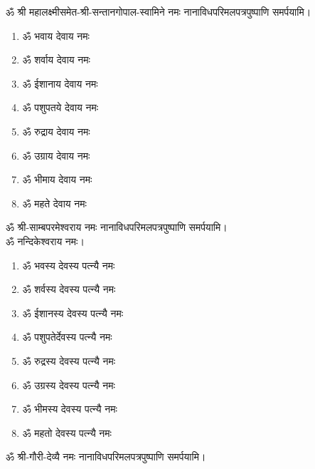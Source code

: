 \begin{center}
ॐ श्री महालक्ष्मीसमेत-श्री-सन्तानगोपाल-स्वामिने नमः नानाविधपरिमलपत्रपुष्पाणि समर्पयामि। \medskip

\clearpage
{}

\vspace{-1em}
\begin{multicols}{2}
\begin{enumerate}
\item ॐ भवाय देवाय नमः
\item ॐ शर्वाय देवाय नमः
\item ॐ ईशानाय देवाय नमः
\item ॐ पशुपतये देवाय नमः
\item ॐ रुद्राय देवाय नमः
\item ॐ उग्राय देवाय नमः
\item ॐ भीमाय देवाय नमः
\item ॐ महते देवाय नमः
\end{enumerate}
\end{multicols}
\vspace{-1em}
ॐ श्री-साम्बपरमेश्वराय नमः नानाविधपरिमलपत्रपुष्पाणि समर्पयामि। \\
ॐ नन्दिकेश्वराय नमः।

\begin{enumerate}
\item ॐ भवस्य देवस्य पत्न्यै नमः
\item ॐ शर्वस्य देवस्य पत्न्यै नमः
\item ॐ ईशानस्य देवस्य पत्न्यै नमः
\item ॐ पशुपतेर्देवस्य पत्न्यै नमः
\item ॐ रुद्रस्य देवस्य पत्न्यै नमः
\item ॐ उग्रस्य देवस्य पत्न्यै नमः
\item ॐ भीमस्य देवस्य पत्न्यै नमः
\item ॐ महतो देवस्य पत्न्यै नमः
\end{enumerate}

ॐ श्री-गौरी-देव्यै नमः नानाविधपरिमलपत्रपुष्पाणि समर्पयामि। \medskip


\end{center}
